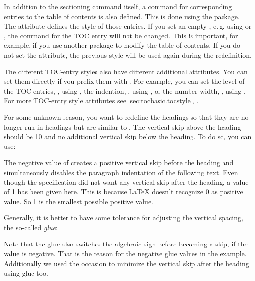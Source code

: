 In addition to the sectioning command itself, a command for
corresponding entries to the table of contents is also defined. This is done
using the \hyperref[cha:tocbasic]{}%
package. The  attribute defines the style of those entries. If
you set an empty , e.\,g. using  or
, the command for the TOC entry will not be
changed. This is important, for example, if you use another package to modify
the table of contents. If you do not set the  attribute, the
previous style will be used again during the redefinition.

The different TOC-entry styles also have different additional
attributes. You can set them directly if you prefix them with .
For example, you can set the level of the TOC entries, , using
, the indention, , using ,
or the number width, , using . For more
TOC-entry style attributes see \autoref{sec:tocbasic.tocstyle},
.

\begin{Example}
  For some unknown reason, you want to redefine the
   headings so that they are no longer run-in
  headings but are similar to . The
  vertical skip above the heading should be 10 and no additional
  vertical skip below the heading. To do so, you can use:
\begin{lstcode}
\end{lstcode}
  The negative value of  creates a positive vertical skip
  before the heading and simultaneously disables the paragraph indentation of
  the following text. Even though the specification did not want any vertical
  skip after the heading, a value of 1 has been given here. This is
  because \LaTeX{} doesn't recognize 0 as positive value. So
  1 is the smallest possible positive value.

  Generally, it is better to have some tolerance for adjusting the vertical
  spacing, the so-called \emph{glue}:
\begin{lstcode}
\end{lstcode}
  Note that the glue also switches the algebraic sign before becoming a skip,
  if the value is negative. That is the reason for the negative glue values in
  the example. Additionally we used the occasion to minimize the vertical skip
  after the heading using glue too.
\end{Example}

